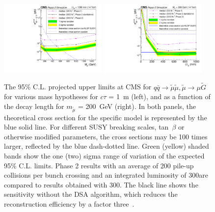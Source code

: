 \begin{figure}[t]\begin{center}
\includegraphics[width=0.47\textwidth]{figures/LimitComparison_withStandAloneEff.pdf}
\includegraphics[width=0.47\textwidth]{figures/LimitComparison_asfuncofCtau.pdf}
\caption{The 95\% C.L. projected upper limits at CMS for $q \bar q \to \widetilde{\mu} \widetilde{\mu}, \widetilde{\mu}\rightarrow \mu\widetilde{G}$ for various mass hypotheses for $c\tau$ = 1~m (left), and as a function of the decay length for $m_{\widetilde{\mu}}$ = 200~GeV (right). In both panels, the theoretical cross section for the specific model is represented by the blue solid line. For different SUSY breaking scales, tan~$\beta$ or otherwise modified parameters, the cross sections may be 100 times larger, reflected by the blue dash-dotted line. Green (yellow) shaded bands show the one (two) sigma range of variation of the expected 95\% C.L. limits. Phase 2 results with an average of 200 pile-up collisions per bunch crossing and an integrated luminosity of $300$\fbinv are compared to results obtained with $300$\fbinv. The black line shows the sensitivity without the DSA algorithm, which reduces the reconstruction efficiency by a factor three~\cite{Lourenco:2283189}.
 }
\label{fig:displResults}
\end{center}
\end{figure}

